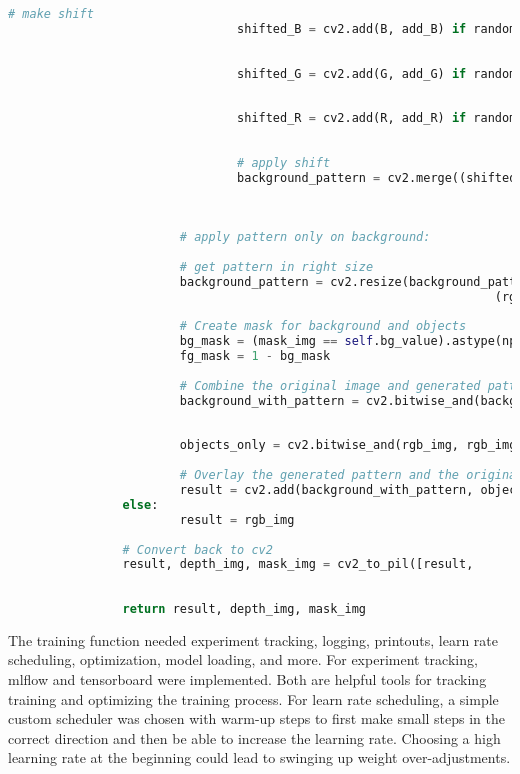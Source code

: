 \begin{lstlisting}[language=Python,caption=Random Augmentation of the Background using cv2 in Python, label=lst:bg-augmentation]
								# make shift
								shifted_B = cv2.add(B, add_B) if random.random() > 0.5 
																								else cv2.subtract(B, add_B)
								
								shifted_G = cv2.add(G, add_G) if random.random() > 0.5 
																								else cv2.subtract(G, add_G)
								
								shifted_R = cv2.add(R, add_R) if random.random() > 0.5 
																								else cv2.subtract(R, add_R)
								
								# apply shift
								background_pattern = cv2.merge((shifted_B, 
																									shifted_G, 
																									shifted_R))
								
						# apply pattern only on background:
						
						# get pattern in right size
						background_pattern = cv2.resize(background_pattern, 
																	(rgb_img.shape[1], rgb_img.shape[0]))
						
						# Create mask for background and objects
						bg_mask = (mask_img == self.bg_value).astype(np.uint8)
						fg_mask = 1 - bg_mask
						
						# Combine the original image and generated pattern
						background_with_pattern = cv2.bitwise_and(background_pattern, 
																													background_pattern, 
																													mask=bg_mask)
						objects_only = cv2.bitwise_and(rgb_img, rgb_img, mask=fg_mask)
						
						# Overlay the generated pattern and the original objects
						result = cv2.add(background_with_pattern, objects_only)
				else:
						result = rgb_img
				
				# Convert back to cv2
				result, depth_img, mask_img = cv2_to_pil([result, 
																										depth_img, 
																										mask_img])
				return result, depth_img, mask_img
		\end{lstlisting}
		\fi
		The training function needed experiment tracking, logging, printouts, learn rate scheduling, optimization, model loading, and more. For experiment tracking, mlflow and tensorboard were implemented. Both are helpful tools for tracking training and optimizing the training process. For learn rate scheduling, a simple custom scheduler was chosen with warm-up steps to first make small steps in the correct direction and then be able to increase the learning rate. Choosing a high learning rate at the beginning could lead to swinging up weight over-adjustments. \\
